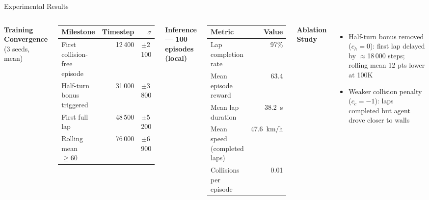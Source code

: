 \documentclass[aspectratio=169,9pt]{beamer}
\begin{document}
\begin{frame}{Experimental Results}
  \begin{columns}[T]
      \textbf{Training Convergence} {\small (3 seeds, mean)}
      \begin{center}
        \small
        \begin{tabular}{lrr}
          \toprule
          Milestone & Timestep & $\sigma$ \\
          \midrule
          First collision-free episode & 12\,400 & $\pm$2\,100 \\
          Half-turn bonus triggered    & 31\,000 & $\pm$3\,800 \\
          \alert{First full lap}       & \alert{48\,500} & $\pm$5\,200 \\
          Rolling mean $\geq 60$       & 76\,000 & $\pm$6\,900 \\
          \bottomrule
        \end{tabular}
      \end{center}

      \vspace{0.2em}
      \textbf{Inference — 100 episodes (local)}
      \begin{center}
        \small
        \begin{tabular}{lr}
          \toprule
          Metric & Value \\
          \midrule
          \alert{Lap completion rate}   & \alert{97\%} \\
          Mean episode reward           & 63.4 \\
          Mean lap duration             & 38.2~s \\
          Mean speed (completed laps)   & 47.6~km/h \\
          Collisions per episode        & 0.01 \\
          \bottomrule
        \end{tabular}
      \end{center}

      \textbf{Ablation Study}
      \begin{itemize}\setlength\itemsep{1pt}
        \item Half-turn bonus removed ($c_h=0$): first lap delayed by \alert{$\approx$18\,000 steps}; rolling mean 12 pts lower at 100K
        \item Weaker collision penalty ($c_c=-1$): laps completed but agent drove closer to walls
      \end{itemize}


\end{columns}
\end{frame}
\end{document}
